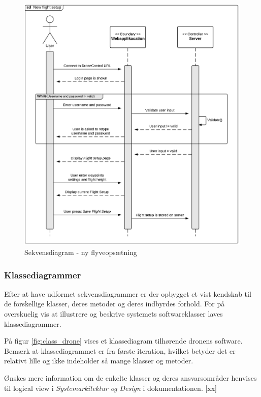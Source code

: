 \begin{figure}[H]
	\centering
	\includegraphics[width=1\textwidth]{Billeder/sekvens.png}
	\vspace{-0.6cm}	
	\caption{Sekvensdiagram - ny flyveopsætning}
	\label{fig:login_flysetting}
\end{figure}

\newpage
\subsubsection*{Klassediagrammer}
\vspace{-0.3cm}	

Efter at have udformet sekvensdiagrammer er der opbygget et vist kendskab til de forskellige klasser, deres metoder og deres indbyrdes forhold. For på overskuelig vis at illustrere og beskrive systemets softwareklasser laves klassediagrammer.

På figur \ref{fig:class_drone} vises et klassediagram tilhørende dronens software. Bemærk at klassediagrammet er fra første iteration, hvilket betyder det er relativt lille og ikke indeholder så mange klasser og metoder.

Ønskes mere information om de enkelte klasser og deres ansvarsområder henvises til logical view i \textit{Systemarkitektur og Design} i dokumentationen. [xx]

